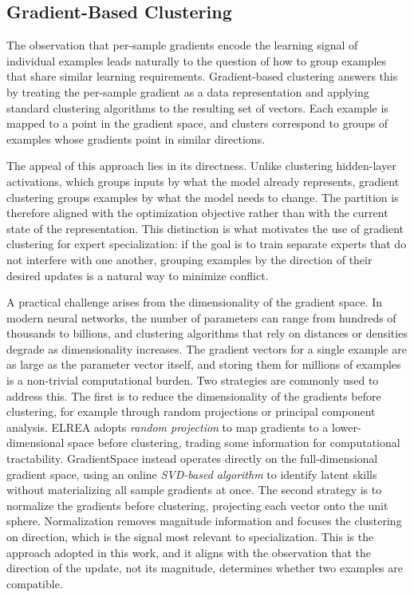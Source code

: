 \subsection{Gradient-Based Clustering}\label{sec:gradient-clustering-bg}

The observation that per-sample gradients encode the learning signal of individual examples leads naturally to the question of how to group examples that share similar learning requirements. Gradient-based clustering answers this by treating the per-sample gradient as a data representation and applying standard clustering algorithms to the resulting set of vectors. Each example is mapped to a point in the gradient space, and clusters correspond to groups of examples whose gradients point in similar directions.

The appeal of this approach lies in its directness. Unlike clustering hidden-layer activations, which groups inputs by what the model already represents, gradient clustering groups examples by what the model needs to change. The partition is therefore aligned with the optimization objective rather than with the current state of the representation. This distinction is what motivates the use of gradient clustering for expert specialization: if the goal is to train separate experts that do not interfere with one another, grouping examples by the direction of their desired updates is a natural way to minimize conflict.

A practical challenge arises from the dimensionality of the gradient space. In modern neural networks, the number of parameters can range from hundreds of thousands to billions, and clustering algorithms that rely on distances or densities degrade as dimensionality increases. The gradient vectors for a single example are as large as the parameter vector itself, and storing them for millions of examples is a non-trivial computational burden. Two strategies are commonly used to address this. The first is to reduce the dimensionality of the gradients before clustering, for example through random projections or principal component analysis. ELREA adopts \emph{random projection} to map gradients to a lower-dimensional space before clustering, trading some information for computational tractability. GradientSpace instead operates directly on the full-dimensional gradient space, using an online \emph{SVD-based algorithm} to identify latent skills without materializing all sample gradients at once. The second strategy is to normalize the gradients before clustering, projecting each vector onto the unit sphere. Normalization removes magnitude information and focuses the clustering on direction, which is the signal most relevant to specialization. This is the approach adopted in this work, and it aligns with the observation that the direction of the update, not its magnitude, determines whether two examples are compatible.

